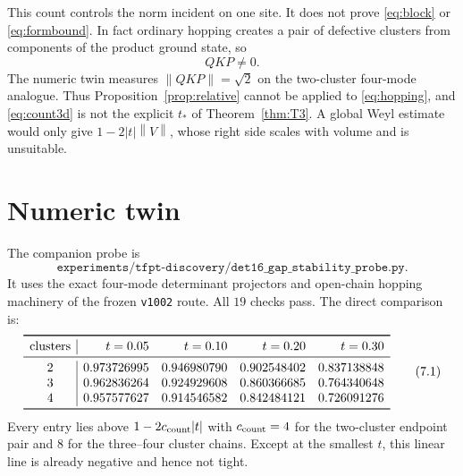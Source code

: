\documentclass[11pt]{article}
\theoremstyle{remark}
\newcommand{\norm}[1]{\left\lVert #1\right\rVert}
\begin{document}
This count controls the norm incident on one site.  It does not prove
\eqref{eq:block} or \eqref{eq:formbound}.  In fact ordinary hopping
creates a pair of defective clusters from components of the product
ground state, so
\[
 QK P\ne0.
\tag{6.8}\label{eq:notblock}
\]
The numeric twin measures
$\norm{QKP}=\sqrt2$ on the two-cluster four-mode analogue.  Thus
Proposition~\ref{prop:relative} cannot be applied to
\eqref{eq:hopping}, and \eqref{eq:count3d} is not the explicit
$t_*$ of Theorem~\ref{thm:T3}.  A global Weyl estimate would only give
$1-2|t|\norm V$, whose right side scales with volume and is unsuitable.

\begin{center}
\setlength{\fboxsep}{9pt}
\end{center}

\section{Numeric twin}

The companion probe is
\[
 \texttt{experiments/tfpt-discovery/det16\_gap\_stability\_probe.py}.
\]
It uses the exact four-mode determinant projectors and open-chain
hopping machinery of the frozen \texttt{v1002} route.  All $19$ checks
pass.  The direct comparison is:
\[
\begin{array}{c|rrrr}
\toprule
\text{clusters}&t=0.05&t=0.10&t=0.20&t=0.30\\
\midrule
2&0.973726995&0.946980790&0.902548402&0.837138848\\
3&0.962836264&0.924929608&0.860366685&0.764340648\\
4&0.957577627&0.914546582&0.842484121&0.726091276\\
\bottomrule
\end{array}
\tag{7.1}\label{eq:numeric}
\]
Every entry lies above $1-2c_{\rm count}|t|$ with
$c_{\rm count}=4$ for the two-cluster endpoint pair and $8$ for the
three--four cluster chains.  Except at the smallest $t$, this linear
line is already negative and hence not tight.
\end{document}
